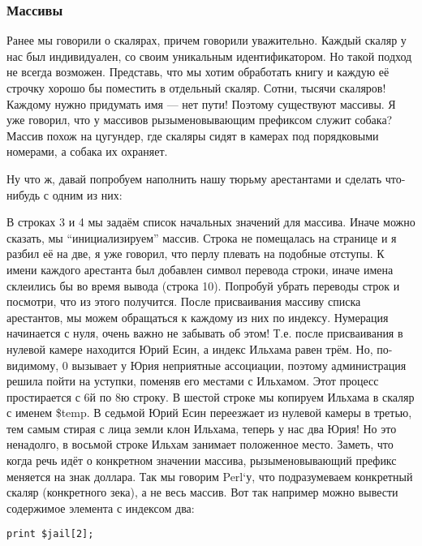 \subsubsection{Массивы}

Ранее мы говорили о скалярах, причем говорили уважительно. Каждый скаляр 
у нас был индивидуален, со своим уникальным идентификатором. Но такой 
подход не всегда возможен. Представь, что мы хотим обработать книгу и 
каждую её строчку хорошо бы поместить в отдельный скаляр. Сотни, тысячи 
скаляров! Каждому нужно придумать имя --- нет пути! Поэтому существуют 
массивы. Я уже говорил, что у массивов рызыменовывающим префиксом служит 
собака? Массив похож на цугундер, где скаляры сидят в камерах под 
порядковыми номерами, а собака их охраняет.

Ну что ж, давай попробуем наполнить нашу тюрьму арестантами и сделать 
что-нибудь с одним из них:

\label{prisoners-src}

В строках 3 и 4 мы задаём список начальных значений для массива. Иначе 
можно сказать, мы ``инициализируем'' массив. Строка не помещалась на 
странице и я разбил её на две, я уже говорил, что перлу плевать на подобные 
отступы. К имени каждого арестанта был добавлен символ перевода строки, 
иначе имена склеились бы во время вывода (строка 10). Попробуй убрать 
переводы строк и посмотри, что из этого получится. После присваивания 
массиву списка арестантов, мы можем обращаться к каждому из них по 
индексу. Нумерация начинается с нуля, очень важно не забывать об этом! Т.е. 
после присваивания в нулевой камере находится Юрий Есин, а индекс Ильхама 
равен трём. Но, по-видимому, 0 вызывает у Юрия неприятные ассоциации, 
поэтому администрация решила пойти на уступки, поменяв его местами с 
Ильхамом. Этот процесс простирается с 6й по 8ю строку. В шестой строке мы 
копируем Ильхама в скаляр с именем \$temp. В седьмой Юрий Есин 
переезжает из нулевой камеры в третью, тем самым стирая с лица земли 
клон Ильхама, теперь у нас два Юрия! Но это ненадолго, в восьмой строке 
Ильхам занимает положенное место. Заметь, что когда речь идёт о 
конкретном значении массива, рызыменовывающий префикс меняется на знак 
доллара. Так мы говорим Perl`у, что подразумеваем конкретный скаляр 
(конкретного зека), а не весь массив. Вот так например можно вывести
содержимое элемента с индексом два:

\begin{verbatim}
print $jail[2];
\end{verbatim}


